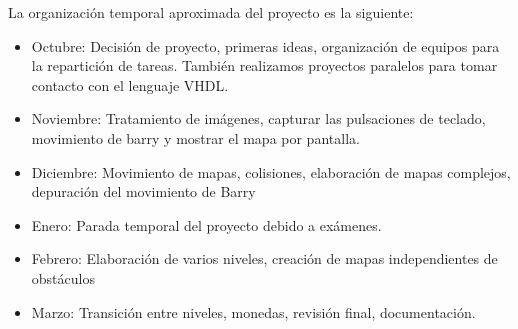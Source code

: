 \documentclass[11pt, a4paper, spanish, openright, twoside]{book}
\begin{document}
La organización temporal aproximada del proyecto es la siguiente:
\begin{itemize}
\item Octubre: Decisión de proyecto, primeras ideas, organización de equipos para la repartición de tareas. También realizamos proyectos paralelos para tomar contacto con el lenguaje VHDL.
\item Noviembre: Tratamiento de imágenes, capturar las pulsaciones de teclado, movimiento de barry y mostrar el mapa por pantalla.
\item Diciembre: Movimiento de mapas, colisiones, elaboración de mapas complejos, depuración del movimiento de Barry
\item Enero: Parada temporal del proyecto debido a exámenes.
\item Febrero: Elaboración de varios niveles, creación de mapas independientes de obstáculos
\item Marzo: Transición entre niveles, monedas, revisión final, documentación.
\end{itemize}
\end{document}
